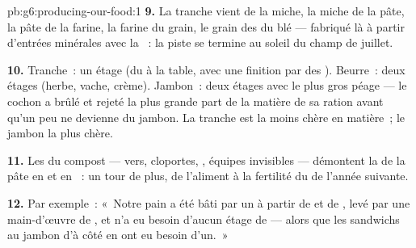 \begin{solution}{pb:g6:producing-our-food:1}
\textbf{9.} La tranche vient de la miche, la miche de la pâte, la
pâte de la farine, la farine du grain, le grain des  du blé
--- fabriqué là à partir d'entrées minérales avec la ~: la
piste se termine au soleil du champ de juillet.

\textbf{10.} Tranche~: un étage (du  à la table, avec une
finition par des ). Beurre~: deux étages (herbe, vache,
crème). Jambon~: deux étages avec le plus gros péage --- le cochon a
brûlé et rejeté la plus grande part de la matière de sa ration avant
qu'un peu ne devienne du jambon. La tranche est la moins chère en
matière~; le jambon la plus chère.

\textbf{11.} Les  du compost --- vers, cloportes,
, équipes invisibles --- démontent la 
de la pâte en  et en ~: un tour de plus, de
l'aliment à la fertilité du  de l'année suivante.

\textbf{12.} Par exemple~: «~Notre pain a été bâti par un 
à partir de  et de , levé par une
main-d'œuvre de , et n'a eu besoin d'aucun étage de
 --- alors que les sandwichs au jambon d'à côté en ont
eu besoin d'un.~»
\end{solution}
